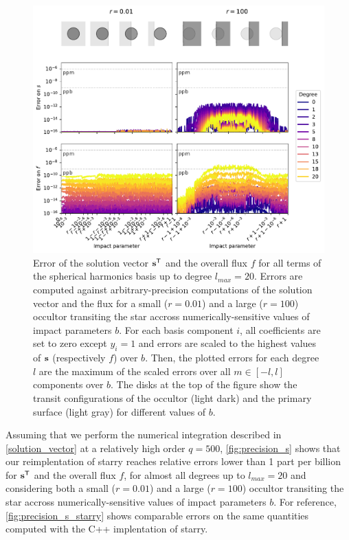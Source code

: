\documentclass[modern]{aastex631}
\begin{document}
\begin{figure}[H]
    \begin{center}
        \includegraphics[width=\textwidth]{../workflows/precision/figures/error_jax.pdf}
        \caption{Error of the solution vector ${\mathbf{s}}^\mathsf{T}$ and the overall flux $f$ for all terms of the spherical harmonics basis up to degree $l_{max}=20$. Errors are computed against arbitrary-precision computations of the solution vector and the flux for a small ($r=0.01$) and a large ($r=100$) occultor transiting the star accross numerically-sensitive values of impact parameters $b$. For each basis component $i$, all coefficients are set to zero except $y_i=1$ and errors are scaled to the highest values of ${\mathbf{s}}$ (respectively $f$) over $b$. Then, the plotted errors for each degree $l$ are the maximum of the scaled errors over all $m\in [-l, l]$ components over $b$. The disks at the top of the figure show the transit configurations of the occultor (light dark) and the primary surface (light gray) for different values of $b$. }
        \label{fig:precision_s}
    \end{center}
\end{figure}
Assuming that we perform the numerical integration described in \autoref{solution_vector} at a relatively high order $q=500$, \autoref{fig:precision_s} shows that our reimplentation of \textsf{starry} reaches relative errors lower than 1 part per billion for ${\mathbf{s}}^\mathsf{T}$ and the overall flux $f$, for almost all degrees up to $l_{max}=20$ and considering both a small ($r=0.01$) and a large ($r=100$) occultor transiting the star accross numerically-sensitive values of impact parameters $b$. For reference, \autoref{fig:precision_s_starry} shows comparable errors on the same quantities computed with the C++ implentation of \textsf{starry}. \\\\
\end{document}
